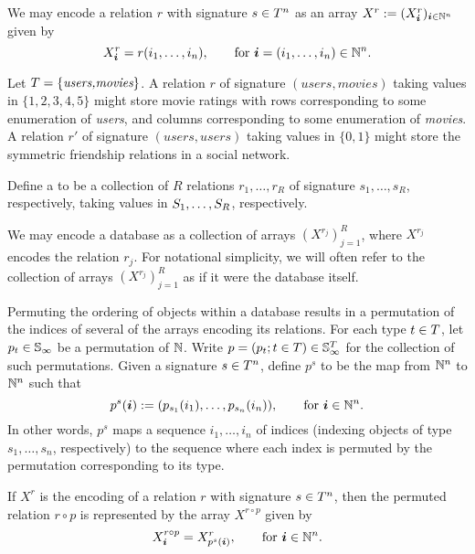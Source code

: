 We may encode a relation $r$ with signature $s \in T^n$ as an array $X^r := (X^r_{\bm{i}})_{\bm{i} \in \mathbb{N}^n}$ given by
\[
X^r_{\bm{i}} = r(i_1,\dotsc,i_n), \qquad \text{for } \bm{i} = (i_1,\dotsc, i_n) \in \mathbb{N}^n.
\]

\begin{example} 
Let $T = \{\textit{users,movies}\}$.
A relation $r$ of signature $(\textit{users},\textit{movies})$ taking values in $\{1,2,3,4,5\}$ might store movie ratings with rows corresponding to some enumeration of \textit{users}, and columns corresponding to some enumeration of \textit{movies}. 
A relation $r'$ of signature $(\textit{users},\textit{users})$ taking values in $\{0,1\}$ might store the symmetric friendship relations in a social network.
\end{example}

\begin{definition}[database]
Define a  to be a collection of $R$ relations $r_1,\dotsc,r_R$ of signature $s_1,\dotsc,s_R$, respectively, taking values in $S_1,\dotsc,S_R$, respectively.
\end{definition}

We may encode a database as a collection of arrays $(X^{r_j})_{j=1}^R$, where $X^{r_j}$ encodes the relation $r_j$.  
For notational simplicity, we will often refer to the collection of arrays $(X^{r_j})_{j=1}^R$ as if it were the database itself.

Permuting the ordering of objects within a database results in a permutation of the indices of several of the arrays encoding its relations.
For each type $t \in T$, let $p_t \in \mathbb{S}_{\infty}$ be a permutation of $\mathbb{N}$. 
Write $p = (p_t ; t \in T) \in \mathbb{S}_{\infty}^T$ for the collection of such permutations.
Given a signature $s \in T^n$, define $p^s$ to be the map from $\mathbb{N}^n$ to $\mathbb{N}^n$ such that
\[
p^s(\bm{i}) := (p_{s_1}(i_1), \dotsc,p_{s_n}(i_n)), \qquad \text{for } \bm{i} \in \mathbb{N}^n.
\]
In other words, $p^s$ maps a sequence $i_1,\dotsc,i_n$ of indices (indexing objects of type $s_1,\dotsc,s_n$, respectively) to the sequence where each index is permuted by the permutation corresponding to its type.

If $X^r$ is the encoding of a relation $r$ with signature $s \in T^n$, then the permuted relation $r \circ p$ is represented by the array $X^{r\circ p}$ given by
\[
X^{r \circ p}_{\bm{i}} = X^r_{p^s(\bm{i})}, \qquad \text{for } \bm{i} \in \mathbb{N}^n.
\]


